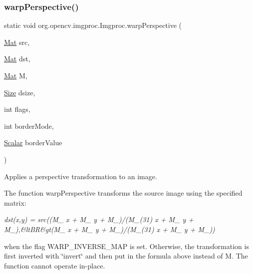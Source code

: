 \subsubsection{\texorpdfstring{warp\+Perspective()}{warpPerspective()}\hspace{0.1cm}{\footnotesize\ttfamily [1/3]}}
{\footnotesize\ttfamily static void org.\+opencv.\+imgproc.\+Imgproc.\+warp\+Perspective (\begin{DoxyParamCaption}\item[{\mbox{\hyperlink{classorg_1_1opencv_1_1core_1_1_mat}{Mat}}}]{src,  }\item[{\mbox{\hyperlink{classorg_1_1opencv_1_1core_1_1_mat}{Mat}}}]{dst,  }\item[{\mbox{\hyperlink{classorg_1_1opencv_1_1core_1_1_mat}{Mat}}}]{M,  }\item[{\mbox{\hyperlink{classorg_1_1opencv_1_1core_1_1_size}{Size}}}]{dsize,  }\item[{int}]{flags,  }\item[{int}]{border\+Mode,  }\item[{\mbox{\hyperlink{classorg_1_1opencv_1_1core_1_1_scalar}{Scalar}}}]{border\+Value }\end{DoxyParamCaption})\hspace{0.3cm}{\ttfamily [static]}}

Applies a perspective transformation to an image.

The function {\ttfamily warp\+Perspective} transforms the source image using the specified matrix\+:

{\itshape dst(x,y) = src((M\+\_ x + M\+\_ y + M\+\_)/(M\+\_\+(31) x + M\+\_ y + M\+\_),\&lt\+BR\&gt(M\+\_ x + M\+\_ y + M\+\_)/(M\+\_\+(31) x + M\+\_ y + M\+\_))}

when the flag {\ttfamily W\+A\+R\+P\+\_\+\+I\+N\+V\+E\+R\+S\+E\+\_\+\+M\+AP} is set. Otherwise, the transformation is first inverted with \char`\"{}invert\char`\"{} and then put in the formula above instead of {\ttfamily M}. The function cannot operate in-\/place.



